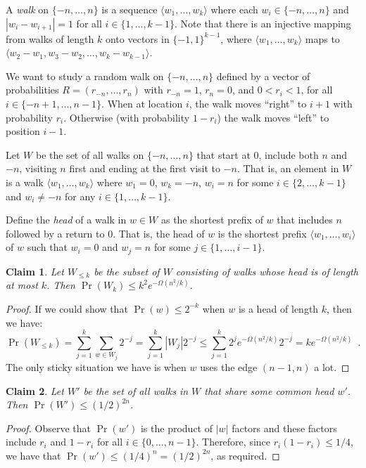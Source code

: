 \documentclass{article}
\newtheorem{clm}{Claim}
\begin{document}
A \emph{walk} on $\{-n,\ldots,n\}$ is a sequence $\langle
w_1,\ldots,w_k\rangle$ where each $w_i\in\{-n,\ldots,n\}$ and
$|w_i-w_{i+1}| = 1$ for all $i\in\{1,\ldots,k-1\}$.  Note that
there is an injective mapping from walks of length $k$ onto vectors
in $\{-1,1\}^{k-1}$, where $\langle w_1,\ldots,w_k\rangle$ maps
to $\langle w_2-w_1,w_3-w_2,\ldots,w_k-w_{k-1}\rangle$.

We want to study a random walk on $\{-n,\ldots,n\}$ defined by a vector
of probabilities $R=(r_{-n},\ldots,r_n)$ with $r_{-n} = 1$, $r_n = 0$,
and $0< r_i < 1$, for all $i \in \{-n+1,...,n-1\}$. When at location $i$,
the walk moves ``right'' to $i+1$ with probability $r_i$.  Otherwise (with
probability $1-r_i$) the walk moves ``left'' to position $i-1$.

Let $W$ be the set of all walks on $\{-n,\ldots,n\}$ that start at
0, include both $n$ and $-n$, visiting $n$ first and ending at the
first visit to $-n$.  That is, an element in $W$ is a walk $\langle
w_1,\ldots,w_k\rangle$ where $w_1=0$, $w_k = -n$, $w_i = n$ for some
$i\in\{2,\ldots,k-1\}$ and $w_i\neq -n$ for any $i\in\{1,\ldots,k-1\}$.

Define the \emph{head} of a walk in $w\in W$ as the shortest prefix
of $w$ that includes $n$ followed by a return to 0. That is, the head
of $w$ is the shortest prefix $\langle w_1,\ldots,w_i\rangle$ of $w$
such that $w_i=0$ and $w_j = n$ for some $j\in\{1,\ldots,i-1\}$.

\begin{clm}
Let $W_{\le k}$ be the subset of $W$ consisting of walks whose head is of
length at most $k$.  Then $\Pr(W_k) \le k^2 e^{-\Omega(n^2/k)}$.
\end{clm}

\begin{proof}
If we could show that $\Pr(w) \le 2^{-k}$ when $w$ is a head of length $k$, then we have:
\[
  \Pr(W_{\le k}) 
  = \sum_{j=1}^k\sum_{w\in W_{j}} 2^{-j}
  = \sum_{j=1}^k|W_{j}| 2^{-j}
  \le \sum_{j=1}^k 2^je^{-\Omega(n^2/k)}2^{-j}
  = ke^{-\Omega(n^2/k)} \enspace .
\]
The only sticky situation we have is when $w$ uses the edge $(n-1,n)$ a lot.
\end{proof}




\begin{clm}\label{claim:one}
Let $W'$ be the set of all walks in $W$ that share some common head $w'$.
Then $\Pr(W') \le (1/2)^{2n}$.
\end{clm}

\begin{proof}
Observe that $\Pr(w')$ is the product of $|w|$ factors and these factors
include $r_i$ and $1-r_i$ for all $i\in\{0,\ldots,n-1\}$.  Therefore,
since $r_i(1-r_i) \le 1/4$, we have that $\Pr(w') \le (1/4)^n =
(1/2)^{2n}$, as required.
\end{proof}
\end{document}
